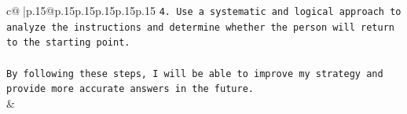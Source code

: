 \documentclass{article}
\begin{document}
{\begin{supertabular}{c@{$\;$}|p{.15\linewidth}@{}p{.15\linewidth}p{.15\linewidth}p{.15\linewidth}p{.15\linewidth}p{.15\linewidth}}
{{{\texttt{4. Use a systematic and logical approach to analyze the instructions and determine whether the person will return to the starting point.} \\
\\ 
\texttt{By following these steps, I will be able to improve my strategy and provide more accurate answers in the future.} \\
            }
        }
    }
    & \\ \\

\end{supertabular}
}
\end{document}
